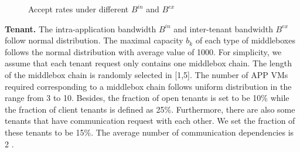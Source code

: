\documentclass[review]{elsarticle}
\begin{document}
\begin{figure}[h]
	\centering
	
	\caption{Accept rates under different $B^{in}$ and $ B^{ex}$}
	\label{fig:accept_rate}
\end{figure}

\textbf{Tenant.} %
The intra-application bandwidth $B^{in}$ and inter-tenant bandwidth $B^{ex}$ follow normal distribution. The maximal capacity $b_k$ of each type of middleboxes follows the normal distribution with average value of 1000. For simplicity, we assume that each tenant request only contains one middlebox chain. The length of the middlebox chain is randomly selected in [1,5]. The number of APP VMs required corresponding to a middlebox chain follows uniform distribution in the range from 3 to 10. 
Besides, the fraction of open tenants is set to be 10\% while the fraction of client tenants is defined as 25\%. Furthermore, there are also some tenants that have communication request with each other. We set the fraction of these tenants to be 15\%. The average number of communication dependencies is 2 \cite{B13cta}.
\end{document}
